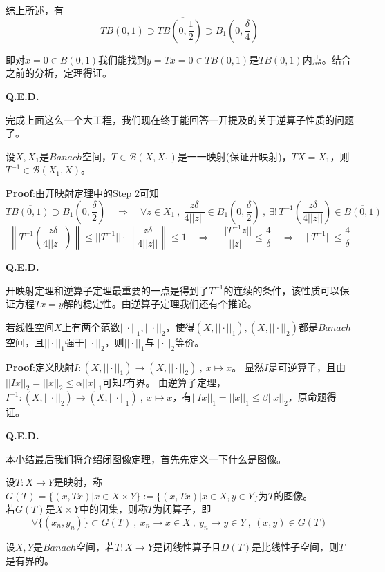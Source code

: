 综上所述，有
\[TB(0,1) \supset T\overline{B(0,\frac{1}{2})} \supset B_1(0,\frac{\delta}{4})\]

即对$x=0 \in B(0,1)$我们能找到$y=Tx=0 \in TB(0,1)$是$TB(0,1)$内点。结合之前的分析，定理得证。

\textbf{Q.E.D.}

完成上面这么一个大工程，我们现在终于能回答一开提及的关于逆算子性质的问题了。
\begin{theorem}[逆算子定理]
    设$X,X_1$是$Banach$空间，$T \in \mathscr{B}(X,X_1)$是一一映射(保证开映射)，$TX=X_1$，则$T^{-1} \in \mathscr{B}(X_1,X)$。
\end{theorem} 
\textbf{Proof}:由开映射定理中的Step 2可知
\[T\overline{B(0,1)} \supset B_1(0,\frac{\delta}{2}) \quad \Rightarrow \quad \forall z \in X_1 \ , \  \frac{z\delta}{4||z||} \in B_1(0,\frac{\delta}{2}) \ , \ \exists ! \, T^{-1}\left(\frac{z\delta}{4||z||}\right) \in \overline{B(0,1)}\]
\[\left\|T^{-1}\left(\frac{z\delta}{4||z||}\right)\right\| \leq ||T^{-1}|| \cdot \left\|\frac{z\delta}{4||z||}\right\| \leq 1 \quad \Rightarrow \quad \frac{||T^{-1}z||}{||z||} \leq \frac{4}{\delta} \quad \Rightarrow \quad ||T^{-1}|| \leq \frac{4}{\delta}\]

\textbf{Q.E.D.}

开映射定理和逆算子定理最重要的一点是得到了$T^{-1}$的连续的条件，该性质可以保证方程$Tx=y$解的稳定性。由逆算子定理我们还有个推论。
\begin{proposition}
    若线性空间$X$上有两个范数$||\cdot||_1,||\cdot||_2$，使得$(X,||\cdot||_1),(X,||\cdot||_2)$都是$Banach$空间，且$||\cdot||_1$强于$||\cdot||_2$，则$||\cdot||_1$与$||\cdot||_2$等价。
\end{proposition}
\textbf{Proof}:定义映射$I:(X,||\cdot||_1) \to (X,||\cdot||_2) \ , \ x \mapsto x$。
显然$I$是可逆算子，且由$||Ix||_2=||x||_2 \leq \alpha ||x||_1$可知$I$有界。
由逆算子定理，$I^{-1}:(X,||\cdot||_2) \to (X,||\cdot||_1) \ , \ x \mapsto x$，有$||Ix||_1=||x||_1 \leq \beta ||x||_2$，原命题得证。

\textbf{Q.E.D.}

本小结最后我们将介绍闭图像定理，首先先定义一下什么是图像。
\begin{definition}[图像，闭图像]
    设$T:X \to Y$是映射，称$G(T)=\{(x,Tx)|x \in X \times Y\}:=\{(x,Tx)|x \in X ,y \in Y\}$为$T$的图像。\\
    若$G(T)$是$X \times Y$中的闭集，则称$T$为闭算子，即
    \[\forall \{(x_n,y_n)\} \subset G(T) \ , \ x_n \to x \in X \ , \ y_n \to y \in Y \ , \ (x,y) \in G(T)\]
\end{definition}
\begin{theorem}[闭图像定理]
    设$X,Y$是$Banach$空间，若$T:X \to Y$是闭线性算子且$D(T)$是比线性子空间，则$T$是有界的。
\end{theorem} 

